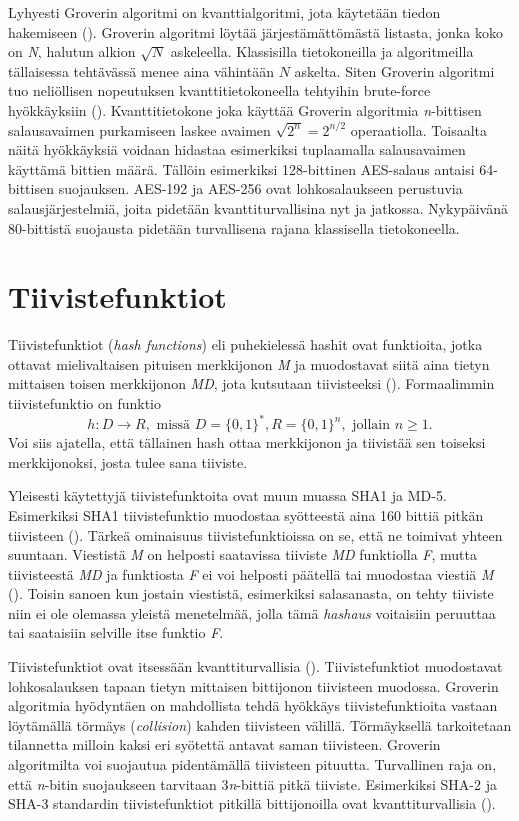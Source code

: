  Lyhyesti Groverin algoritmi on kvanttialgoritmi, jota käytetään tiedon hakemiseen (\cite{hayward2008quantum}). Groverin algoritmi löytää järjestämättömästä listasta, jonka koko on \emph{N}, halutun alkion $\sqrt{N}$ askeleella. Klassisilla tietokoneilla ja algoritmeilla tällaisessa tehtävässä menee aina vähintään $N$ askelta. Siten Groverin algoritmi tuo neliöllisen nopeutuksen kvanttitietokoneella tehtyihin brute-force hyökkäyksiin (\cite{mavroeidis2018impact}). Kvanttitietokone joka käyttää Groverin algoritmia \emph{n}-bittisen salausavaimen purkamiseen laskee avaimen $\sqrt{2^{n}} = 2^{n/2}$ operaatiolla. Toisaalta näitä hyökkäyksiä voidaan hidastaa esimerkiksi tuplaamalla salausavaimen käyttämä bittien määrä. Tällöin esimerkiksi 128-bittinen AES-salaus antaisi 64-bittisen suojauksen. AES-192 ja AES-256 ovat lohkosalaukseen perustuvia salausjärjestelmiä, joita pidetään kvanttiturvallisina nyt ja jatkossa. Nykypäivänä 80-bittistä suojausta pidetään turvallisena rajana klassisella tietokoneella.
 
 \section{Tiivistefunktiot}
 Tiivistefunktiot (\emph{hash functions}) eli puhekielessä hashit  ovat funktioita, jotka ottavat mielivaltaisen pituisen merkkijonon \emph{M} ja muodostavat siitä aina tietyn mittaisen toisen merkkijonon \emph{MD}, jota kutsutaan tiivisteeksi (\cite{sobti2012cryptographic}). Formaalimmin tiivistefunktio on funktio
 \[h: D \to R, \text{ missä } D = \big\{0,1\big\}^{*}, R = \big\{0,1\big\}^{n}, \text{ jollain } n \geq 1.\] Voi siis ajatella, että tällainen hash ottaa merkkijonon ja tiivistää sen toiseksi merkkijonoksi, josta tulee sana tiiviste.
 
 Yleisesti käytettyjä tiivistefunktoita ovat muun muassa SHA1 ja MD-5. Esimerkiksi SHA1 tiivistefunktio muodostaa syötteestä aina 160 bittiä pitkän tiivisteen (\cite{bellare2005introduction}). Tärkeä ominaisuus tiivistefunktioissa on se, että ne toimivat yhteen suuntaan. Viestistä \emph{M} on helposti saatavissa tiiviste \emph{MD} funktiolla \emph{F}, mutta tiivisteestä \emph{MD} ja funktiosta \emph{F} ei voi helposti päätellä tai muodostaa viestiä \emph{M} (\cite{bakhtiari1995cryptographic}). Toisin sanoen kun jostain viestistä, esimerkiksi salasanasta, on tehty tiiviste niin ei ole olemassa yleistä menetelmää, jolla tämä \emph{hashaus} voitaisiin peruuttaa tai saataisiin selville itse funktio \emph{F}.
 
 Tiivistefunktiot ovat itsessään kvanttiturvallisia (\cite{mavroeidis2018impact}). Tiivistefunktiot muodostavat lohkosalauksen tapaan tietyn mittaisen bittijonon tiivisteen muodossa. Groverin algoritmia hyödyntäen on mahdollista tehdä hyökkäys tiivistefunktioita vastaan löytämällä törmäys (\emph{collision}) kahden tiivisteen välillä. Törmäyksellä tarkoitetaan tilannetta milloin kaksi eri syötettä antavat saman tiivisteen. Groverin algoritmilta voi suojautua pidentämällä tiivisteen pituutta. Turvallinen raja on, että \emph{n}-bitin suojaukseen tarvitaan 3\emph{n}-bittiä pitkä tiiviste. Esimerkiksi SHA-2 ja SHA-3 standardin tiivistefunktiot pitkillä bittijonoilla ovat kvanttiturvallisia (\cite{mavroeidis2018impact}).
 
